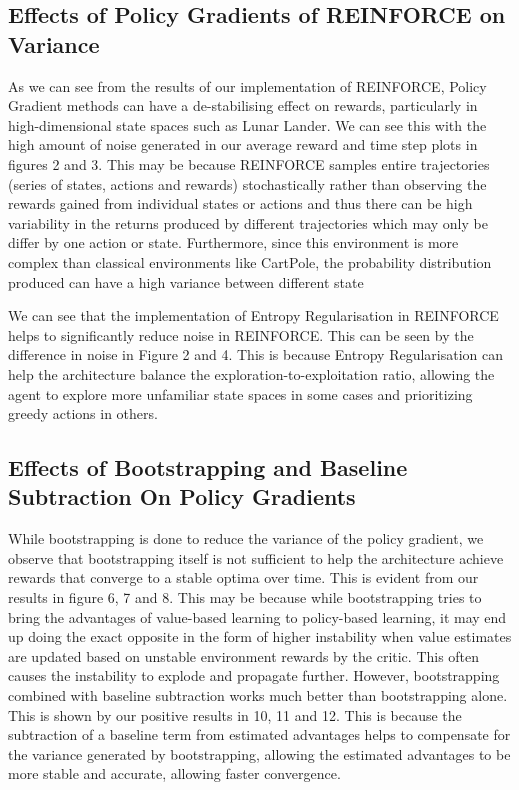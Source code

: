 \documentclass{article}
\begin{document}
\subsection{Effects of Policy Gradients of REINFORCE on Variance}
\par As we can see from the results of our implementation of REINFORCE, Policy Gradient methods can have a de-stabilising effect on rewards, particularly in high-dimensional state spaces such as Lunar Lander. We can see this with the high amount of noise generated in our average reward and time step plots in figures 2 and 3. This may be because REINFORCE samples entire trajectories (series of states, actions and rewards) stochastically rather than observing the rewards gained from individual states or actions and thus there can be high variability in the returns produced by different trajectories which may only be differ by one action or state. Furthermore, since this environment is more complex than classical environments like CartPole, the probability distribution produced can have a high variance between different state%
\par We can see that the implementation of Entropy Regularisation in REINFORCE helps to significantly reduce noise in REINFORCE. This can be seen by the difference in noise in Figure 2 and 4. This is because Entropy Regularisation can help the architecture balance the exploration-to-exploitation ratio, allowing the agent to explore more unfamiliar state spaces in some cases and prioritizing greedy actions in others.
\subsection{Effects of Bootstrapping and Baseline Subtraction On Policy Gradients}
\par  While bootstrapping is done to reduce the variance of the policy gradient, we observe that bootstrapping itself is not sufficient to help the architecture achieve rewards that converge to a stable optima over time. This is evident from our results in figure 6, 7 and 8. This may be because while bootstrapping tries to bring the advantages of value-based learning to policy-based learning, it may end up doing the exact opposite in the form of higher instability when value estimates are updated based on unstable environment rewards by the critic. This often causes the instability to explode and propagate further. However, bootstrapping combined with baseline subtraction works much better than bootstrapping alone. This is shown by our positive results in 10, 11 and 12. This is because the subtraction of a baseline term from estimated advantages helps to compensate for the variance generated by bootstrapping, allowing the estimated advantages to be more stable and accurate, allowing faster convergence.
\end{document}
